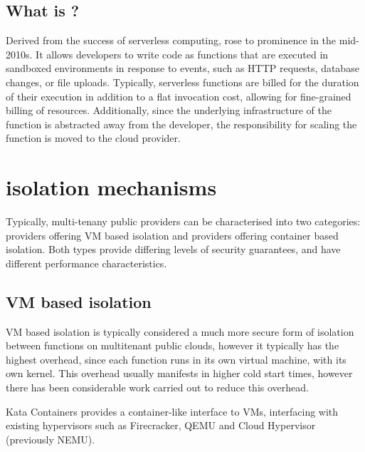 \subsection{What is \faas{}?}
Derived from the success of serverless computing, \faas{} rose to prominence in the mid-2010s\cite{AmazonWebServices2014,azureAnnouncingGeneralAvailability2016}. It allows developers to write code as functions that are executed in sandboxed environments in response to events, such as HTTP requests, database changes, or file uploads\cite{EventarcOverview,EventListenerAmazon,robeceOverviewAzureEvent2024}. Typically, serverless functions are billed for the duration of their execution in addition to a flat invocation cost, allowing for fine-grained billing of resources\cite{bortoliniInvestigatingPerformanceCost2020}. Additionally, since the underlying infrastructure of the function is abstracted away from the developer, the responsibility for scaling the function is moved to the cloud provider.

\section{\faas{} isolation mechanisms}
Typically, multi-tenany public \faas{} providers can be characterised into two categories: providers offering VM based isolation\cite{agacheFirecrackerLightweightVirtualization2020} and providers offering container based isolation\cite{GVisor}. Both types provide differing levels of security guarantees, and have different performance characteristics.

\subsection{VM based isolation}
VM based isolation is typically considered a much more secure form of isolation between \faas{} functions on multitenant public clouds\cite{jithinVirtualMachineIsolation2014}, however it typically has the highest overhead, since each function runs in its own virtual machine, with its own kernel. This overhead usually manifests in higher cold start times, however there has been considerable work carried out to reduce this overhead\cite{razaviPrebakedUVMsScalable2015,agacheFirecrackerLightweightVirtualization2020,dawXanaduMitigatingCascading2020,oliverstenbomRefunctionEliminatingServerless2019}.

Kata Containers\cite{KataContainersOpen} provides a container-like interface to VMs, interfacing with existing hypervisors such as Firecracker\cite{agacheFirecrackerLightweightVirtualization2020}, QEMU\cite{QEMU} and Cloud Hypervisor\cite{CloudhypervisorCloudhypervisorVirtual} (previously NEMU\cite{IntelNemu2024}).

